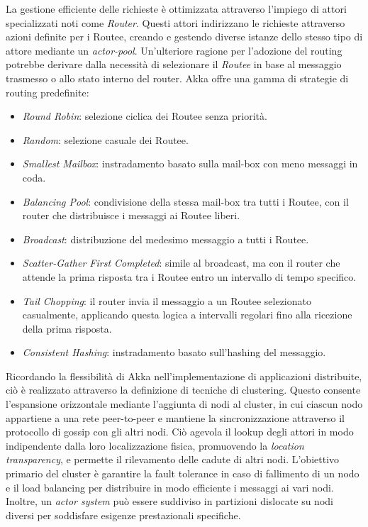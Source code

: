 La gestione efficiente delle richieste è ottimizzata attraverso l'impiego di attori specializzati noti come \textit{Router}.
Questi attori indirizzano le richieste attraverso azioni definite per i Routee, creando e gestendo diverse istanze dello stesso tipo di attore mediante un \textit{actor-pool}.
Un'ulteriore ragione per l'adozione del routing potrebbe derivare dalla necessità di selezionare il \textit{Routee} in base al messaggio trasmesso o allo stato interno del router.
Akka offre una gamma di strategie di routing predefinite:
\begin{itemize}
  \item \textit{Round Robin}: selezione ciclica dei Routee senza priorità.
  \item \textit{Random}: selezione casuale dei Routee.
  \item \textit{Smallest Mailbox}: instradamento basato sulla mail-box con meno messaggi in coda.
  \item \textit{Balancing Pool}: condivisione della stessa mail-box tra tutti i Routee, con il router che distribuisce i messaggi ai Routee liberi.
  \item \textit{Broadcast}: distribuzione del medesimo messaggio a tutti i Routee.
  \item \textit{Scatter-Gather First Completed}: simile al broadcast, ma con il router che attende la prima risposta tra i Routee entro un intervallo di tempo specifico.
  \item \textit{Tail Chopping}: il router invia il messaggio a un Routee selezionato casualmente, applicando questa logica a intervalli regolari fino alla ricezione della prima risposta.
  \item \textit{Consistent Hashing}: instradamento basato sull'hashing del messaggio.
\end{itemize}
Ricordando la flessibilità di Akka nell'implementazione di applicazioni distribuite, ciò è realizzato attraverso la definizione di tecniche di clustering.
Questo consente l'espansione orizzontale mediante l'aggiunta di nodi al cluster, in cui ciascun nodo appartiene a una rete peer-to-peer e mantiene la sincronizzazione attraverso il protocollo di gossip con gli altri nodi.
Ciò agevola il lookup degli attori in modo indipendente dalla loro localizzazione fisica, promuovendo la \textit{location transparency}, e permette il rilevamento delle cadute di altri nodi.
L'obiettivo primario del cluster è garantire la fault tolerance in caso di fallimento di un nodo e il load balancing per distribuire in modo efficiente i messaggi ai vari nodi.
Inoltre, un \textit{actor system} può essere suddiviso in partizioni dislocate su nodi diversi per soddisfare esigenze prestazionali specifiche.